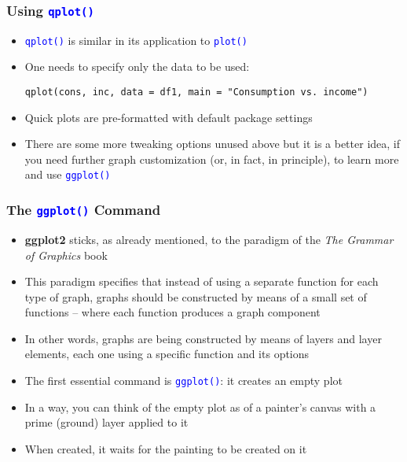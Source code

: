 \documentclass[10pt]{beamer}
\newcommand{\cc}[1]{\texttt{\textcolor{blue}{#1}}}
\theoremstyle{definition}
\begin{document}
\begin{frame}[fragile]
\frametitle{Using \cc{qplot()}}
\begin{itemize}
	\item \cc{qplot()} is similar in its application to \cc{plot()}
	\item One needs to specify only the data to be used:
	\begin{lstlisting}[style = rstyle, breaklines]
	qplot(cons, inc, data = df1, main = "Consumption vs. income")
	\end{lstlisting}
	\item Quick plots are pre-formatted with default package settings
	\item There are some more tweaking options unused above but it is a better idea, if you need further graph customization (or, in fact, in principle), to learn more and use \cc{ggplot()}
\end{itemize}
\end{frame}

\begin{frame}[fragile]
\frametitle{The \cc{ggplot()} Command}
\begin{itemize}
	\item \textbf{ggplot2} sticks, as already mentioned, to the paradigm of the \emph{The Grammar of Graphics} book
	\item This paradigm specifies that instead of using a separate function for each type of graph, graphs should be constructed by means of a small set of functions -- where each function produces a graph component
	\item In other words, graphs are being constructed by means of layers and layer elements, each one using a specific function and its options
	\item The first essential command is \cc{ggplot()}: it creates an empty plot
	\item In a way, you can think of the empty plot as of a painter's canvas with a prime (ground) layer applied to it
	\item When created, it waits for the painting to be created on it
\end{itemize}
\end{frame}
\end{document}

